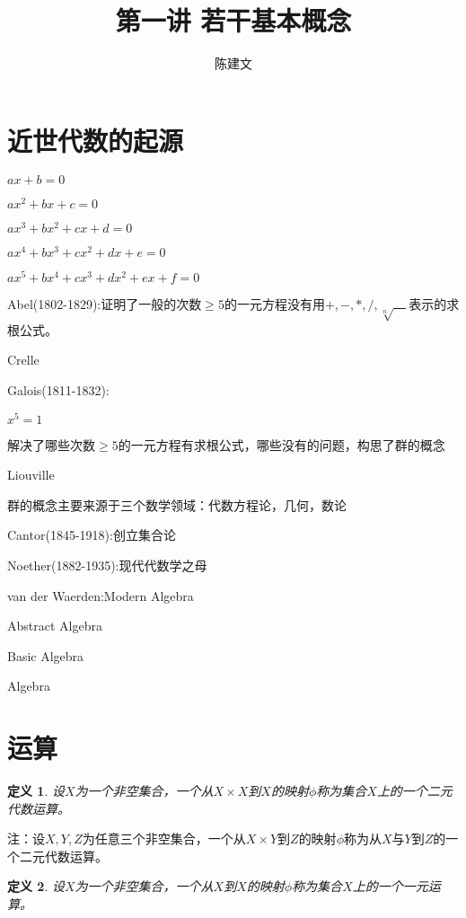 \documentclass{article}
\newtheorem{Def}{定义}
\begin{document}
\begin{CJK*}{UTF8}{gbsn}
  \title{第一讲 若干基本概念}
  \author{陈建文}
  \maketitle
  

\section{近世代数的起源}


$ax+b=0$

$ax^2+bx+c=0$

$ax^3+bx^2+cx+d=0$

$ax^4+bx^3+cx^2+dx+e=0$

$ax^5+bx^4+cx^3+dx^2+ex+f=0$

Abel(1802-1829):证明了一般的次数$\geq 5$的一元方程没有用$+,-,*,/,\sqrt[n]{\quad}$表示的求根公式。

Crelle

Galois(1811-1832):

$x^5=1$

解决了哪些次数$\geq 5$的一元方程有求根公式，哪些没有的问题，构思了群的概念

Liouville

群的概念主要来源于三个数学领域：代数方程论，几何，数论

Cantor(1845-1918):创立集合论

Noether(1882-1935):现代代数学之母

van der Waerden:Modern Algebra

Abstract Algebra

Basic Algebra

Algebra



\section{运算}
\begin{Def}
  设$X$为一个非空集合，一个从$X\times X$到$X$的映射$\phi$称为集合$X$上的一个二元代数运算。
\end{Def}
  
注：设$X,Y,Z$为任意三个非空集合，一个从$X\times Y$到$Z$的映射$\phi$称为从$X$与$Y$到$Z$的一个二元代数运算。

\begin{Def}
  设$X$为一个非空集合，一个从$X$到$X$的映射$\phi$称为集合$X$上的一个一元运算。
\end{Def}


\end{CJK*}
\end{document}
